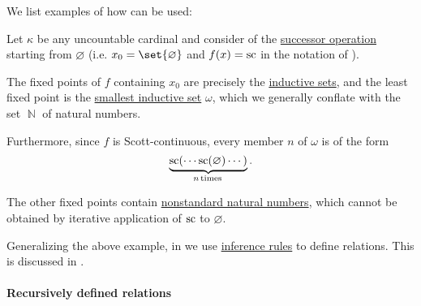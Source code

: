 \begin{example}\label{ex:thm:knaster_tarski_iteration}
  We list examples of how  can be used:
  \begin{thmenum}
     Let \( \kappa \) be any uncountable cardinal and consider  of the \hyperref[def:ordinal_successor]{successor operation} starting from \( \varnothing \) (i.e. \( x_0 = \set{ \varnothing } \) and  \( f(x) = \op{sc} \) in the notation of ).

    The fixed points of \( f \) containing \( x_0 \) are precisely the \hyperref[def:inductive_set]{inductive sets}, and the least fixed point is the \hyperref[thm:smallest_inductive_set_existence]{smallest inductive set} \( \omega \), which we generally conflate with the set \( \BbbN \) of natural numbers.

    Furthermore, since \( f \) is Scott-continuous, every member \( n \) of \( \omega \) is of the form
    \begin{equation*}
      \underbrace{ \op{sc}( \cdots \op{sc}(\varnothing) \cdots ) }_{n \T*{times}}.
    \end{equation*}

    The other fixed points contain \hyperref[rem:standard_models_of_arithmetic]{nonstandard natural numbers}, which cannot be obtained by iterative application of \( \op{sc} \) to \( \varnothing \).

     Generalizing the above example, in  we use \hyperref[def:inference_rule]{inference rules} to define relations. This is discussed in .
  \end{thmenum}
\end{example}

\paragraph{Recursively defined relations}

